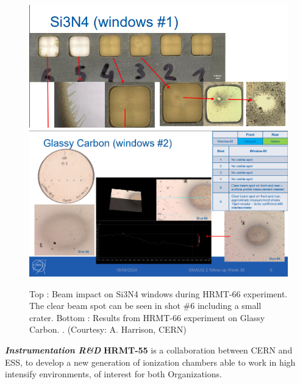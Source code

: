 \begin{figure}[!h]
    \centering
    \includegraphics[width=0.85\linewidth]{graphics/hiradmat_si3n4.png} \\
    \includegraphics[width=0.85\linewidth]{graphics/hiradmat_GC.png}

    \caption{Top : Beam impact on Si3N4 windows during HRMT-66 experiment. The clear beam spot can be seen in shot \#6 including a small crater. Bottom : Results from HRMT-66 experiment on Glassy Carbon. . (Courtesy: A. Harrison, CERN)}
    \label{fig:hiradmat_Si3N4}
\end{figure}


\textbf{\textit{Instrumentation R\&D}} \mbox{}
\textbf{HRMT-55} is a collaboration between CERN and ESS, to develop a new generation of ionization chambers able to work in high intensify environments, of interest for both Organizations.

